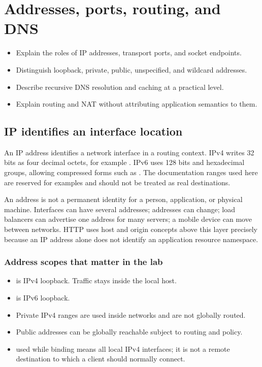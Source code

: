 \chapter{Addresses, ports, routing, and DNS}

\begin{objectives}
\begin{itemize}
  \item Explain the roles of IP addresses, transport ports, and socket endpoints.
  \item Distinguish loopback, private, public, unspecified, and wildcard addresses.
  \item Describe recursive DNS resolution and caching at a practical level.
  \item Explain routing and NAT without attributing application semantics to them.
\end{itemize}
\end{objectives}

\section{IP identifies an interface location}

An IP address identifies a network interface in a routing context. IPv4 writes
32 bits as four decimal octets, for example . IPv6 uses 128
bits and hexadecimal groups, allowing compressed forms such as .
The documentation ranges used here are reserved for examples and should not be
treated as real destinations.

An address is not a permanent identity for a person, application, or physical
machine. Interfaces can have several addresses; addresses can change; load
balancers can advertise one address for many servers; a mobile device can move
between networks. HTTP uses host and origin concepts above this layer precisely
because an IP address alone does not identify an application resource namespace.

\subsection{Address scopes that matter in the lab}

\begin{itemize}
  \item {} is IPv4 loopback. Traffic stays inside the local host.
  \item {} is IPv6 loopback.
  \item Private IPv4 ranges are used inside networks and are not globally routed.
  \item Public addresses can be globally reachable subject to routing and policy.
  \item {} used while binding means all local IPv4 interfaces; it is
        not a remote destination to which a client should normally connect.
\end{itemize}


